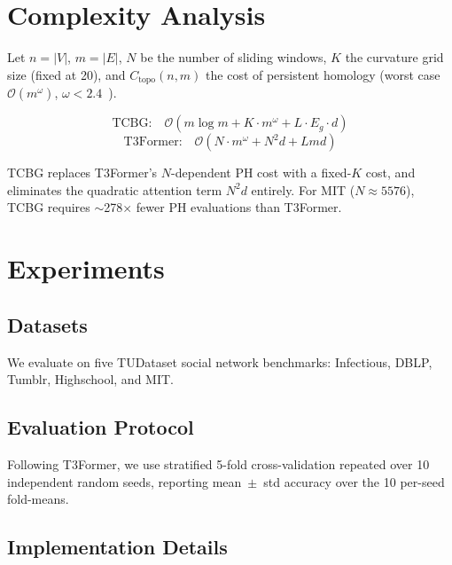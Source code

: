 \documentclass[conference]{IEEEtran}
\begin{document}
\section{Complexity Analysis}
\label{sec:complexity}

Let $n=|V|$, $m=|E|$, $N$ be the number of sliding windows,
$K$ the curvature grid size (fixed at 20), and $C_\text{topo}(n,m)$
the cost of persistent homology (worst case $\mathcal{O}(m^\omega)$,
$\omega < 2.4$~\cite{otter2017roadmap}).

\begin{equation}
    \text{TCBG:}\quad \mathcal{O}\!\left(m\log m + K\cdot m^\omega + L\cdot E_g \cdot d\right)
\end{equation}
\begin{equation}
    \text{T3Former:}\quad \mathcal{O}\!\left(N\cdot m^\omega + N^2 d + Lmd\right)
\end{equation}

TCBG replaces T3Former's $N$-dependent PH cost with a fixed-$K$ cost,
and eliminates the quadratic attention term $N^2 d$ entirely.
For MIT ($N\approx 5576$), TCBG requires $\sim$278$\times$ fewer PH
evaluations than T3Former.

\section{Experiments}
\label{sec:experiments}

\subsection{Datasets}
We evaluate on five TUDataset social network benchmarks: Infectious,
DBLP, Tumblr, Highschool, and MIT.

\subsection{Evaluation Protocol}
Following T3Former, we use stratified 5-fold cross-validation repeated
over 10 independent random seeds, reporting mean~$\pm$~std accuracy
over the 10 per-seed fold-means.

\subsection{Implementation Details}
\end{document}
